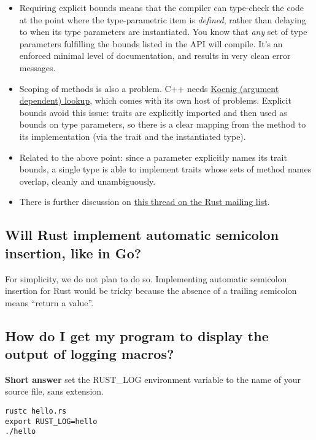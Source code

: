 \documentclass[]{article}
\begin{document}
\begin{itemize}
\item
  Requiring explicit bounds means that the compiler can type-check the
  code at the point where the type-parametric item is \emph{defined},
  rather than delaying to when its type parameters are instantiated. You
  know that \emph{any} set of type parameters fulfilling the bounds
  listed in the API will compile. It's an enforced minimal level of
  documentation, and results in very clean error messages.
\item
  Scoping of methods is also a problem. C++ needs
  \href{http://en.wikipedia.org/wiki/Argument-dependent_name_lookup}{Koenig
  (argument dependent) lookup}, which comes with its own host of
  problems. Explicit bounds avoid this issue: traits are explicitly
  imported and then used as bounds on type parameters, so there is a
  clear mapping from the method to its implementation (via the trait and
  the instantiated type).
\item
  Related to the above point: since a parameter explicitly names its
  trait bounds, a single type is able to implement traits whose sets of
  method names overlap, cleanly and unambiguously.
\item
  There is further discussion on
  \href{https://mail.mozilla.org/pipermail/rust-dev/2013-September/005603.html}{this
  thread on the Rust mailing list}.
\end{itemize}

\subsection{Will Rust implement automatic semicolon insertion, like in
Go?}\label{will-rust-implement-automatic-semicolon-insertion-like-in-go}

For simplicity, we do not plan to do so. Implementing automatic
semicolon insertion for Rust would be tricky because the absence of a
trailing semicolon means ``return a value''.

\subsection{How do I get my program to display the output of logging
macros?}\label{how-do-i-get-my-program-to-display-the-output-of-logging-macros}

\textbf{Short answer} set the RUST\_LOG environment variable to the name
of your source file, sans extension.

\begin{verbatim}
rustc hello.rs
export RUST_LOG=hello
./hello
\end{verbatim}
\end{document}
